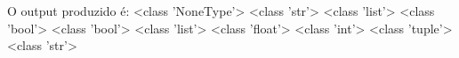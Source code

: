 \documentclass[12pt,varwidth=16cm,border=1pt]{standalone}
\begin{document}
O output produzido é:\newline
<class 'NoneType'>\newline
<class 'str'>\newline
<class 'list'>\newline
<class 'bool'>\newline
<class 'bool'>\newline
<class 'list'>\newline
<class 'float'>\newline
<class 'int'>\newline
<class 'tuple'>\newline
<class 'str'>
\end{document}
